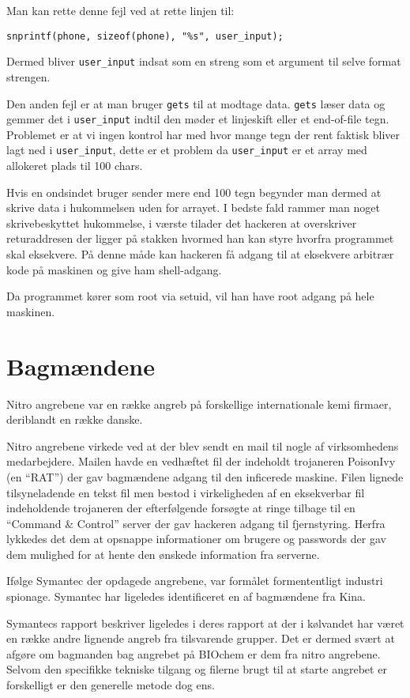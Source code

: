 \documentclass[10pt,a4paper,danish]{article}
\begin{document}
Man kan rette denne fejl ved at rette linjen til:
\begin{verbatim}
snprintf(phone, sizeof(phone), "%s", user_input);
\end{verbatim}
Dermed bliver \texttt{user\_input} indsat som en streng som et argument til
selve format strengen.


Den anden fejl er at man bruger \texttt{gets} til at modtage data.
\texttt{gets} læser data og gemmer det i \texttt{user\_input} indtil den møder et linjeskift eller et end-of-file
tegn.
Problemet er at vi ingen kontrol har med hvor mange tegn der rent faktisk bliver
lagt ned i \texttt{user\_input}, dette er et problem da \texttt{user\_input} er
et array med allokeret plads til 100 chars.

Hvis en ondsindet bruger sender mere end 100 tegn begynder man dermed at skrive
data i hukommelsen uden for arrayet.
I bedste fald rammer man noget skrivebeskyttet hukommelse, i værste tilader det
hackeren at overskriver returaddresen der ligger på stakken hvormed han kan
styre hvorfra programmet skal eksekvere. På denne måde kan hackeren få adgang
til at eksekvere arbitrær kode på maskinen og give ham shell-adgang.

Da programmet kører som root via setuid, vil han have root adgang på hele
maskinen.

\section{Bagmændene}
Nitro angrebene var en række angreb på forskellige internationale kemi firmaer,
deriblandt en række danske.

Nitro angrebene virkede ved at der blev sendt en mail til nogle af virksomhedens
medarbejdere. Mailen havde en vedhæftet fil der indeholdt trojaneren PoisonIvy
(en ``RAT'') der gav bagmændene adgang til
den inficerede maskine. Filen lignede tilsyneladende en tekst fil men bestod i
virkeligheden af en eksekverbar fil indeholdende trojaneren der efterfølgende
forsøgte at ringe tilbage til en ``Command \& Control'' server der gav hackeren
adgang til fjernstyring.
Herfra lykkedes det dem at opsnappe informationer om
brugere og passwords der gav dem mulighed for at hente den ønskede information
fra serverne.

Ifølge Symantec der opdagede angrebene, var formålet formententligt industri
spionage. Symantec har ligeledes identificeret en af bagmændene fra Kina.

Symantecs rapport\cite{nitro-article} beskriver ligeledes i deres rapport at der i kølvandet har været en
række andre lignende angreb fra tilsvarende grupper. Det er dermed svært at
afgøre om bagmanden bag angrebet på BIOchem er dem fra nitro angrebene.
Selvom den specifikke tekniske tilgang og filerne brugt til at starte angrebet
er forskelligt er den generelle metode dog ens.
\end{document}
